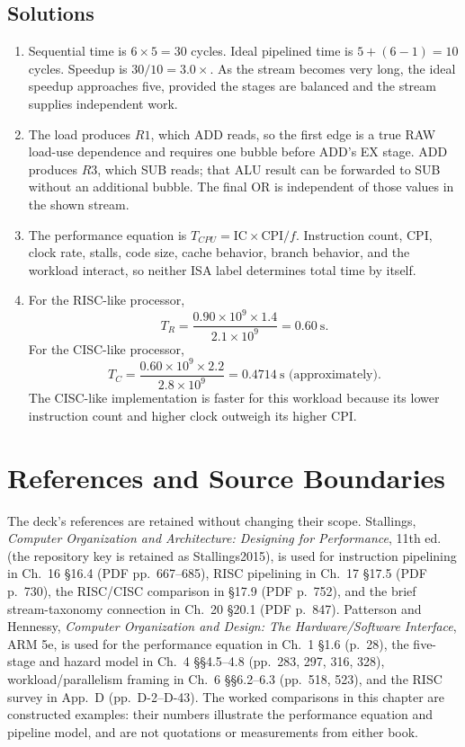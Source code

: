 \documentclass[11pt]{article}
\begin{document}
\subsection*{Solutions}
\begingroup\small
\begin{enumerate}
  \item Sequential time is $6\times5=30$ cycles. Ideal pipelined time is
        $5+(6-1)=10$ cycles. Speedup is $30/10=3.0\times$. As the stream
        becomes very long, the ideal speedup approaches five, provided the
        stages are balanced and the stream supplies independent work.
  \item The load produces $R1$, which ADD reads, so the first edge is a true
        RAW load-use dependence and requires one bubble before ADD's EX stage.
        ADD produces $R3$, which SUB reads; that ALU result can be forwarded
        to SUB without an additional bubble. The final OR is independent of
        those values in the shown stream.
  \item The performance equation is
        $T_{CPU}=\mathrm{IC}\times\mathrm{CPI}/f$. Instruction count, CPI,
        clock rate, stalls, code size, cache behavior, branch behavior, and
        the workload interact, so neither ISA label determines total time by
        itself.
  \item For the RISC-like processor,
        \[
          T_R=\frac{0.90\times10^9\times1.4}{2.1\times10^9}=0.60~\text{s}.
        \]
        For the CISC-like processor,
        \[
          T_C=\frac{0.60\times10^9\times2.2}{2.8\times10^9}=0.4714~\text{s}
          \text{ (approximately)}.
        \]
        The CISC-like implementation is faster for this workload because its
        lower instruction count and higher clock outweigh its higher CPI.
\end{enumerate}
\endgroup

\section*{References and Source Boundaries}

The deck's references are retained without changing their scope. Stallings,
\emph{Computer Organization and Architecture: Designing for Performance},
11th ed. (the repository key is retained as Stallings2015), is used for
instruction pipelining in Ch.~16 §16.4 (PDF pp.~667--685), RISC pipelining in
Ch.~17 §17.5 (PDF p.~730), the RISC/CISC comparison in §17.9 (PDF p.~752),
and the brief stream-taxonomy connection in Ch.~20 §20.1 (PDF p.~847).
Patterson and Hennessy, \emph{Computer Organization and Design: The
Hardware/Software Interface}, ARM 5e, is used for the performance equation in
Ch.~1 §1.6 (p.~28), the five-stage and hazard model in Ch.~4 §§4.5--4.8
(pp.~283, 297, 316, 328), workload/parallelism framing in Ch.~6 §§6.2--6.3
(pp.~518, 523), and the RISC survey in App.~D (pp.~D-2--D-43). The worked
comparisons in this chapter are constructed examples: their numbers illustrate
the performance equation and pipeline model, and are not quotations or
measurements from either book.

\begingroup
\raggedright


\endgroup
\end{document}
